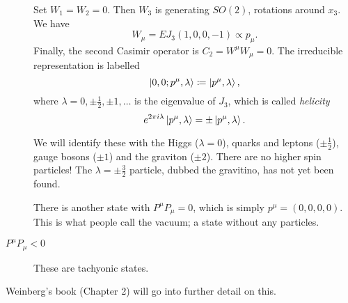 \begin{description}
\begin{remark}
    \end{remark}
    Set $W_1 = W_2 = 0$. Then $W_3$ is generating $SO(2)$, rotations around $x_3$.
    We have
    \begin{equation}
      W_{\mu} = E J_3 (1, 0, 0, -1) \propto p_{\mu}.
    \end{equation}
    Finally, the second Casimir operator is $C_2 = W^{\mu} W_{\mu} = 0$.
    The irreducible representation is labelled
    \begin{equation}
      \ket{0, 0; p^{\mu}, \lambda} \coloneqq \ket{p^{\mu}, \lambda}, 
    \end{equation}
    where $\lambda = 0, \pm \frac{1}{2}, \pm 1, \dots$ is the eigenvalue of $J_3$, which is called \emph{helicity}
    \begin{equation}
      e^{2 \pi i \lambda} \ket{p^{\mu}, \lambda} = \pm \ket{p^{\mu}, \lambda}.
    \end{equation}
    \begin{remark}
      We will identify these with the Higgs ($\lambda = 0$), quarks and leptons ($\pm \frac{1}{2}$), gauge bosons ($\pm 1$) and the graviton ($\pm 2$). There are no higher spin particles!
      The $\lambda = \pm \frac{3}{2}$ particle, dubbed the gravitino, has not yet been found.
    \end{remark}
    \begin{remark}
      There is another state with $P^{\mu} P_{\mu} = 0$, which is simply $p^{\mu} = (0,0,0,0)$. This is what people call the vacuum; a state without any particles.
    \end{remark}
  \item[$P^{\mu} P_{\mu} < 0$] These are tachyonic states.
\end{description}

\begin{remark}
  Weinberg's book (Chapter 2) will go into further detail on this.
\end{remark}
